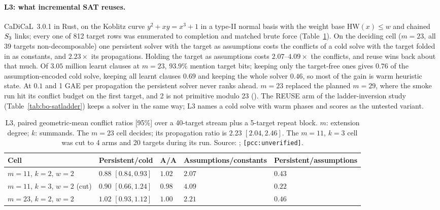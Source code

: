 \paragraph{L3: what incremental SAT reuses.} CaDiCaL~3.0.1 in Rust, on the
Koblitz curve $y^2+xy=x^3+1$ in a type-II normal basis with the weight base
$\mathrm{HW}(x)\le w$ and chained $S_{3}$ links; every one of 812 target
rows was enumerated to completion and matched brute force
(Table~\ref{tab:bt-open7-sat}). On the deciding cell ($m=23$, all 39
targets non-decomposable) one persistent solver with the target as
assumptions costs the conflicts of a cold solve with the target folded in as
constants, and $2.23\times$ its propagations. Holding the target as
assumptions costs $2.07$--$4.09\times$ the conflicts, and reuse wins back
about that much. Of $3.05$ million learnt clauses at $m=23$, $93.9$\% mention
target bits; keeping only the target-free ones gives $0.76$ of the
assumption-encoded cold solve, keeping all learnt clauses $0.69$ and keeping
the whole solver $0.46$, so most of the gain is warm heuristic state. At
$0.1$ and 1 GAE per propagation the persistent solver never ranks ahead.
$m=23$ replaced the planned $m=29$, where the smoke run hit its conflict
budget on the first target, and 2 is not primitive modulo 23
(). The
REUSE arm of the ladder-inversion study (Table~\ref{tab:bo-satladder})
keeps a solver in the same way; L3 names a cold solve with warm phases and
scores as the untested variant.

\begin{table}[t]
\centering\small
\begin{tabular}{@{}lllll@{}}
\toprule
Cell & Persistent/cold & A/A & Assumptions/constants & Persistent/assumptions \\
\midrule
$m=11$, $k=2$, $w=2$ & $0.88$ $[0.84,0.93]$ & $1.02$ & $2.07$ & $0.43$ \\
$m=11$, $k=3$, $w=2$ (cut) & $0.90$ $[0.66,1.24]$ & $0.98$ & $4.09$ & $0.22$ \\
$m=23$, $k=2$, $w=2$ & $1.02$ $[0.93,1.12]$ & $1.00$ & $2.21$ & $0.46$ \\
\bottomrule
\end{tabular}
\caption[]{L3, paired geometric-mean conflict ratios [95\%] over a 40-target
stream plus a 5-target repeat block. $m$: extension degree; $k$: summands.
The $m=23$ cell decides; its propagation ratio is $2.23$ $[2.04,2.46]$. The
$m=11$, $k=3$ cell was cut to 4 arms and 20 targets during its run.
Source: ;
\texttt{[pcc:unverified]}.}
\label{tab:bt-open7-sat}
\end{table}

